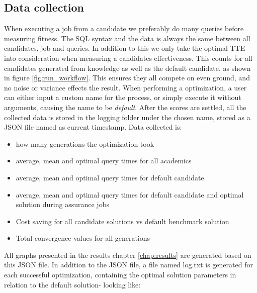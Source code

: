 \documentclass[a4paper,english]{report}
\begin{document}
			\subsection{Data collection}
				When executing a job from a candidate we preferably do many queries before measuring fitness. The SQL syntax and the data is always the same between all candidates, job and queries. In addition to this we only take the optimal TTE into consideration when measuring a candidates effectiveness. This counts for all candidates generated from knowledge as well as the default candidate, as shown in figure \ref{fig:run_workflow}. This ensures they all compete on even ground, and no noise or variance effects the result. When performing a optimization, a user can either input a custom name for the process, or simply execute it without arguments, causing the name to be \textit{default}. After the scores are settled, all the collected data is stored in the logging folder under the chosen name, stored as a JSON file named as current timestamp. Data collected is:
				\begin{itemize}
					\item how many generations the optimization took
					\item average, mean and optimal query times for all academics
					\item average, mean and optimal query times for default candidate
					\item average, mean and optimal query times for default candidate and optimal solution during assurance jobs
					\item Cost saving for all candidate solutions vs default benchmark solution
					\item Total convergence values for all generations
				\end{itemize}
				All graphs presented in the results chapter \ref{chap:results} are generated based on this JSON file. In addition to the JSON file, a file named log.txt is generated for each successful optimization, containing the optimal solution parameters in relation to the default solution- looking like:
				\scriptsize
\end{document}
